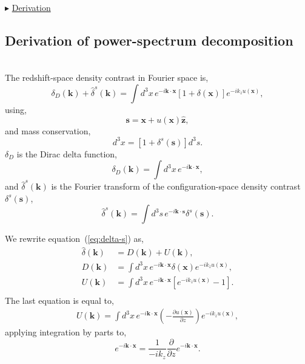 \documentclass[a4paper,11pt, fleqn]{article}
\begin{document}
\vspace{10mm}
$\blacktriangleright$ \hyperlink{sec:decomposed-power-derivation}{Derivation}

%
\newpage
\subsection{Derivation of power-spectrum decomposition}
\label{sec:decomposed-power-derivation}\quad\\

The redshift-space density contrast in Fourier space is,
%
\begin{equation}
  \label{eq:delta-s}
  \delta_D(\bm{k}) + \hat{\delta}^s(\bm{k}) = \int \! d^3 x \, e^{-i\bm{k}\cdot\bm{x}} [1 + \delta(\bm{x})] e^{-ik_z u(\bm{x})},
\end{equation}
%
using,
%
\begin{equation}
  \bm{s} = \bm{x} + u(\bm{x}) \hat{\bm{z}},
\end{equation}
%
and mass conservation,
%
\begin{equation}
  [1 + \delta(\bm{x})] d^3 x = [1 + \delta^s(\bm{s})] d^3 s.
\end{equation}
%
$\delta_D$ is the Dirac delta function,
%
\begin{equation}
  \delta_D(\bm{k}) = \int\! d^3 x \, e^{-i\bm{k}\cdot\bm{x}},
\end{equation}
and $\hat{\delta}^s(\bm{k})$ is the Fourier transform of the
configuration-space density contrast $\delta^s(\bm{s})$,
%
\begin{equation}
  \hat{\delta}^s(\bm{k}) = \int \! d^3 s \,
                           e^{-i\bm{k}\cdot\bm{s}} \delta^s(\bm{s}).
\end{equation}

\vspace{10mm}
We rewrite equation~(\ref{eq:delta-s}) as,
%
\begin{align}
  \hat{\delta}(\bm{k}) &= D(\bm{k}) + U(\bm{k}),\\
  D(\bm{k}) &= \int \! d^3 x \, e^{-i\bm{k}\cdot\bm{x}} \delta(\bm{x})
                                e^{-ik_z u(\bm{x})},\\
  \label{eq:U}
  U(\bm{k}) &= \int \! d^3 x \, e^{-i\bm{k}\cdot\bm{x}}
                              \left[ e^{-ik_z u(\bm{x})} - 1 \right].\\
\end{align}
%
The last equation is equal to,
%
\begin{equation}\begin{split}
  \label{eq:Uprime}
  U(\bm{k}) = \int\! d^3 x \, e^{-i \bm{k}\cdot\bm{x}}
              \left( - \frac{\partial u(\bm{x})}{\partial z} \right)
              e^{-ik_z u(\bm{x})},
\end{split}\end{equation}
applying integration by parts to,
\begin{equation}
  e^{-i \bm{k}\cdot\bm{x}} = \frac{1}{-ik_z}
  \frac{\partial}{\partial z} e^{-i \bm{k}\cdot\bm{x}}.
\end{equation}
\end{document}
